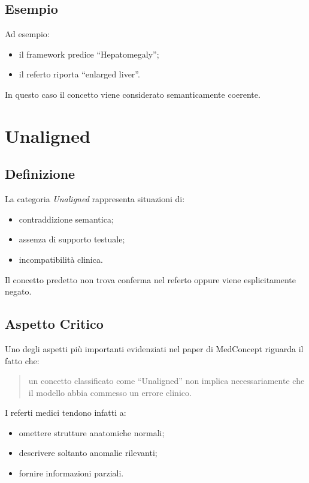 \subsection{Esempio}

Ad esempio:

\begin{itemize}
    \item il framework predice ``Hepatomegaly'';
    \item il referto riporta ``enlarged liver''.
\end{itemize}

In questo caso il concetto viene considerato semanticamente coerente.

\section{Unaligned}

\subsection{Definizione}

La categoria \textit{Unaligned} rappresenta situazioni di:

\begin{itemize}
    \item contraddizione semantica;
    \item assenza di supporto testuale;
    \item incompatibilità clinica.
\end{itemize}

Il concetto predetto non trova conferma nel referto oppure viene esplicitamente negato.

\subsection{Aspetto Critico}

Uno degli aspetti più importanti evidenziati nel paper di MedConcept riguarda il fatto che:

\begin{quote}
un concetto classificato come ``Unaligned'' non implica necessariamente che il modello abbia commesso un errore clinico.
\end{quote}

I referti medici tendono infatti a:

\begin{itemize}
    \item omettere strutture anatomiche normali;
    \item descrivere soltanto anomalie rilevanti;
    \item fornire informazioni parziali.
\end{itemize}


